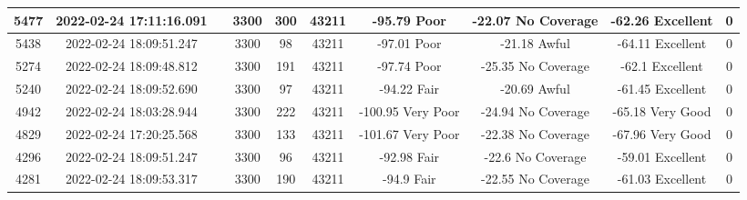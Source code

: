 \begin{longtable*}{|c|c|c|c|c|c|c|c|c|c|}
5477&2022-02-24 17:11:16.091&&3300&300&43211& -95.79    Poor        & -22.07    No Coverage & -62.26    Excellent   & 0\\\hline
{}5438&2022-02-24 18:09:51.247&&3300&98&43211& -97.01    Poor        & -21.18    Awful       & -64.11    Excellent   & 0\\\hline
{}5274&2022-02-24 18:09:48.812&&3300&191&43211& -97.74    Poor        & -25.35    No Coverage & -62.1     Excellent   & 0\\\hline
{}5240&2022-02-24 18:09:52.690&&3300&97&43211& -94.22    Fair        & -20.69    Awful       & -61.45    Excellent   & 0\\\hline
{}4942&2022-02-24 18:03:28.944&&3300&222&43211& -100.95   Very Poor   & -24.94    No Coverage & -65.18    Very Good   & 0\\\hline
{}4829&2022-02-24 17:20:25.568&&3300&133&43211& -101.67   Very Poor   & -22.38    No Coverage & -67.96    Very Good   & 0\\\hline
{}4296&2022-02-24 18:09:51.247&&3300&96&43211& -92.98    Fair        & -22.6     No Coverage & -59.01    Excellent   & 0\\\hline
{}4281&2022-02-24 18:09:53.317&&3300&190&43211& -94.9     Fair        & -22.55    No Coverage & -61.03    Excellent   & 0\\\hline

\end{longtable*}
